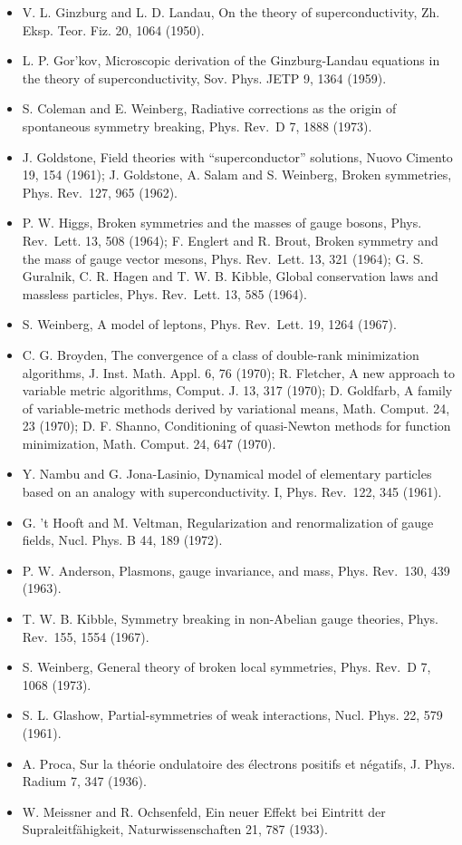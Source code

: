 \documentclass[
  10pt,
]{article}
\begin{document}
\begin{itemize}
\item
  V. L. Ginzburg and L. D. Landau, On the theory of superconductivity,
  Zh. Eksp. Teor. Fiz. 20, 1064 (1950).
\item
  L. P. Gor'kov, Microscopic derivation of the Ginzburg-Landau equations
  in the theory of superconductivity, Sov. Phys. JETP 9, 1364 (1959).
\item
  S. Coleman and E. Weinberg, Radiative corrections as the origin of
  spontaneous symmetry breaking, Phys. Rev.~D 7, 1888 (1973).
\item
  J. Goldstone, Field theories with ``superconductor'' solutions, Nuovo
  Cimento 19, 154 (1961); J. Goldstone, A. Salam and S. Weinberg, Broken
  symmetries, Phys. Rev.~127, 965 (1962).
\item
  P. W. Higgs, Broken symmetries and the masses of gauge bosons, Phys.
  Rev.~Lett. 13, 508 (1964); F. Englert and R. Brout, Broken symmetry
  and the mass of gauge vector mesons, Phys. Rev.~Lett. 13, 321 (1964);
  G. S. Guralnik, C. R. Hagen and T. W. B. Kibble, Global conservation
  laws and massless particles, Phys. Rev.~Lett. 13, 585 (1964).
\item
  S. Weinberg, A model of leptons, Phys. Rev.~Lett. 19, 1264 (1967).
\item
  C. G. Broyden, The convergence of a class of double-rank minimization
  algorithms, J. Inst. Math. Appl. 6, 76 (1970); R. Fletcher, A new
  approach to variable metric algorithms, Comput. J. 13, 317 (1970); D.
  Goldfarb, A family of variable-metric methods derived by variational
  means, Math. Comput. 24, 23 (1970); D. F. Shanno, Conditioning of
  quasi-Newton methods for function minimization, Math. Comput. 24, 647
  (1970).
\item
  Y. Nambu and G. Jona-Lasinio, Dynamical model of elementary particles
  based on an analogy with superconductivity. I, Phys. Rev.~122, 345
  (1961).
\item
  G. 't Hooft and M. Veltman, Regularization and renormalization of
  gauge fields, Nucl. Phys. B 44, 189 (1972).
\item
  P. W. Anderson, Plasmons, gauge invariance, and mass, Phys. Rev.~130,
  439 (1963).
\item
  T. W. B. Kibble, Symmetry breaking in non-Abelian gauge theories,
  Phys. Rev.~155, 1554 (1967).
\item
  S. Weinberg, General theory of broken local symmetries, Phys. Rev.~D
  7, 1068 (1973).
\item
  S. L. Glashow, Partial-symmetries of weak interactions, Nucl. Phys.
  22, 579 (1961).
\item
  A. Proca, Sur la théorie ondulatoire des électrons positifs et
  négatifs, J. Phys. Radium 7, 347 (1936).
\item
  W. Meissner and R. Ochsenfeld, Ein neuer Effekt bei Eintritt der
  Supraleitfähigkeit, Naturwissenschaften 21, 787 (1933).
\end{itemize}
\end{document}
